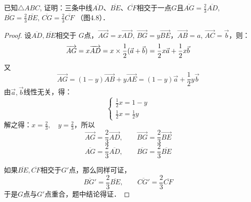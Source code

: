 \begin{figure}[htp]\centering
    \begin{minipage}[t]{0.48\textwidth}
    \centering
{}
    \caption{}
    \end{minipage}
    \begin{minipage}[t]{0.48\textwidth}
    \centering
    \caption{}
    \end{minipage}
    \end{figure}


\begin{example}
    已知$\triangle ABC$, 证明：三条中线$\overline{AD}$、$\overline{BE}$、$\overline{CF}$相交于一点$G$且$\overline{AG}=\frac{2}{3} \overline{AD}$, $\overline{BG}=\frac{2}{3}\overline{BE}$, $\overline{CG}=\frac{2}{3}\overline{CF}$ （图4.8）．
\end{example}

\begin{proof}
    设$\overline{AD},\overline{BE}$相交于
    $G$点，$\Vec{AG}=x\Vec{AD}$, $\Vec{BG}=y\Vec{BE}$，$\Vec{AB}=a$, $\Vec{AC}=\vec{b}$，则：
\[\overrightarrow{AG}=x\overrightarrow{AD}=x\times \dfrac{1}{2}(\vec{a}+\vec{b})=\dfrac{1}{2}x\vec{a}+\dfrac{1}{2}x\vec{b}\]
又    
\[\Vec{AG}=(1-y)\Vec{AB}+y\Vec{AE}=(1-y)\vec{a}+\frac{1}{2}y\vec{b}\]
由$\vec{a},\vec{b}$线性无关，得：
\[\begin{cases}
    \frac{1}{2}x=1-y\\
    \frac{1}{2}x=\frac{1}{2}y
\end{cases}\]
解之得：$x=\frac{2}{3},\quad y=\frac{2}{3}$，所以
\[\Vec{AG}=\frac{2}{3}\Vec{AD},\qquad \Vec{BG}=\frac{2}{3}\Vec{BE}\]
\[\overline{AG}=\frac{2}{3}\overline{AD},\qquad \overline{BG}=\frac{2}{3}\overline{BE}\]

如果$\overline{BE},\overline{CF}$相交于$G'$点，那么同样可证，
\[\overline{BG'}=\frac{2}{3} \overline{BE},\qquad \overline{CG'}=\frac{2}{3}\overline{CF}\]
于是$G$点与$G'$点重合，题中结论得证．
\end{proof}

